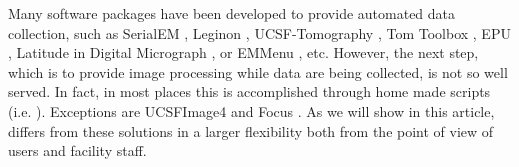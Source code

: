 Many software packages have been developed to provide automated data collection, such as SerialEM \citep{Mastronarde2005}, Leginon \citep{Suloway2009}, UCSF-Tomography \citep{Zheng2007}, Tom Toolbox \citep{Nickell2005}, EPU \citep{EPU}, Latitude in Digital Micrograph \citep{Latitude}, or EMMenu \citep{emmenu}, etc. However, the next step,  which is to provide image processing while  data are being collected, is not so well served. In fact, in most places this is accomplished through home made scripts (i.e. \citep{Pichkur2018}). Exceptions are UCSFImage4 \citep{Li2015} and Focus \citep{Biyani2017}. As we will show in this article, \scipion differs from these solutions in a larger flexibility both from the point of view of users and facility staff.
